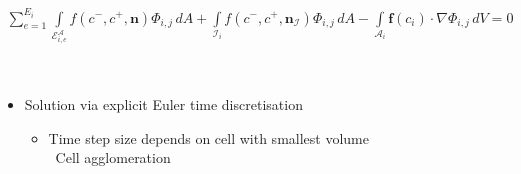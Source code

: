 \begin{frame}
{\begin{minipage}{\the\textwidth}
\begin{align*}
				\sum_{e=1}^{E_i}\int\limits_{\mathcal{E}_{i,e}^\mathcal{A}} f \left( c^-, c^+, \mathbf{n} \right) \Phi_{i,j} \, dA + \int\limits_{\mathcal{I}_{i}} f \left( c^-, c^+, \mathbf{n}_\mathcal{I} \right) \Phi_{i,j} \, dA - \int\limits_{\mathcal{A}_i} \boldsymbol{f}\left(c_i\right) \cdot \nabla\Phi_{i,j} \, dV = 0 
				\end{align*}
			\end{minipage}
			}\\
			\begin{itemize}
				\item Solution via explicit Euler time discretisation
					\begin{itemize}
						\item Time step size depends on cell with smallest volume \\
						\MVRightarrow \, Cell agglomeration
					\end{itemize}
			\end{itemize}
	\end{frame}
